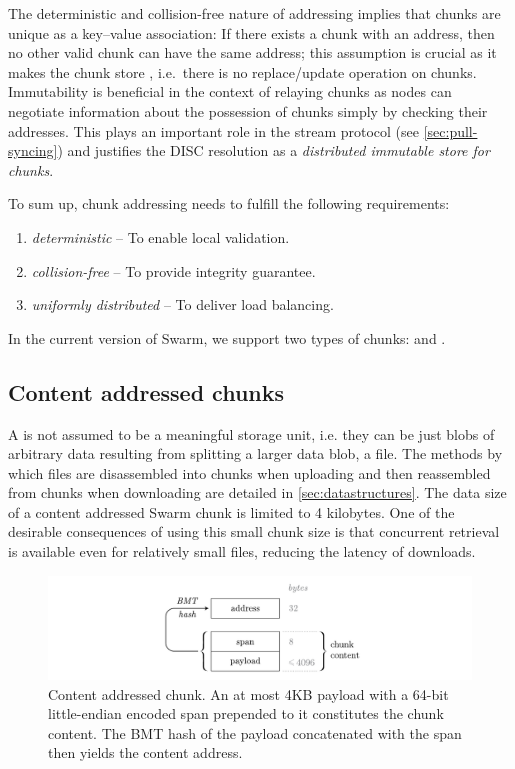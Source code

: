 The deterministic and collision-free nature of addressing implies that chunks are unique as a key--value association: If there exists a chunk with an address, then no other valid chunk can have the same address; this assumption is crucial as it makes the chunk store , i.e.\ there is no replace/update operation on chunks. Immutability is beneficial in the context of relaying chunks as nodes can negotiate information about the possession of chunks simply by checking their addresses. This plays an important role in the stream protocol (see \ref{sec:pull-syncing}) and justifies the DISC resolution as a \emph{distributed immutable store for chunks}.

To sum up, chunk addressing needs to fulfill the following requirements:

\begin{enumerate}
    \item \emph{deterministic} -- To enable local validation.
    \item \emph{collision-free} -- To provide integrity guarantee.
    \item \emph{uniformly distributed} -- To deliver load balancing.
\end{enumerate}

In the current version of Swarm, we support two types of chunks:  and . 

\subsection{Content addressed  chunks\statusgreen}\label{sec:content-addressed-chunks}

A  is not assumed to be a meaningful storage unit, i.e. they can be just blobs of arbitrary data resulting from splitting a larger data blob, a file. The methods by which files are disassembled into chunks when uploading and then reassembled from chunks when downloading are detailed in \ref{sec:datastructures}. The data size of a content addressed Swarm chunk is limited to 4 kilobytes. One of the desirable consequences of using this small chunk size is that concurrent retrieval is available even for relatively small files, reducing the latency of downloads. 

\begin{figure}[htbp]
   \centering
   \includegraphics[width=\textwidth]{fig/content-addressed-chunk-3.pdf}
   \caption[Content addressed chunk\statusgreen]{Content addressed chunk. An at most 4KB payload with a 64-bit little-endian encoded span prepended to it constitutes the chunk content. The BMT hash of the payload concatenated with the span then yields the content address.}
   \label{fig:content-addressed-chunk}
\end{figure}


